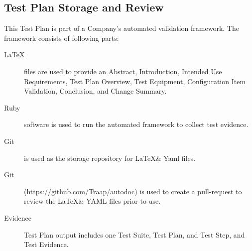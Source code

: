 \subsection{Test Plan Storage and Review}
This Test Plan is part of a Company's automated validation framework.  The
framework consists of following parts:
\begin{description}
  \item[\LaTeX] files are used to provide an Abstract, Introduction, Intended
    Use Requirements, Test Plan Overview, Test Equipment, Configuration
    Item Validation, Conclusion, and Change Summary.

  \item[Ruby] software is used to run the automated framework to collect test
    evidence.

  \item[Git] is used as the storage repository for \LaTeX \& Yaml files.

  \item[Git] (https://github.com/Traap/autodoc) is used to create a pull-request
    to review the \LaTeX \& YAML files prior to use.

  \item[Evidence] Test Plan output includes one Test Suite, Test Plan, and Test
    Step, and Test Evidence.
\end{description}
